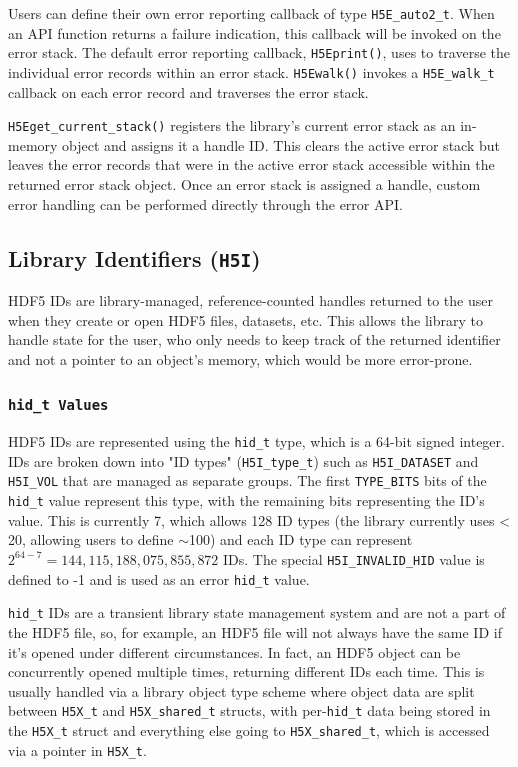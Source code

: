 \begin{itemize}
Users can define their own error reporting callback of type \texttt{H5E\_auto2\_t}. When an API function returns a failure indication, this callback will be invoked on the error stack. The default error reporting callback, \texttt{H5Eprint()}, uses  to traverse the individual error records within an error stack. \texttt{H5Ewalk()} invokes a \texttt{H5E\_walk\_t} callback on each error record and traverses the error stack.

\texttt{H5Eget\_current\_stack()} registers the library's current error stack as an in-memory object and assigns it a handle ID. This clears the active error stack but leaves the error records that were in the active error stack accessible within the returned error stack object. Once an error stack is assigned a handle, custom error handling can be performed directly through the error API. 
\end{itemize}

\subsection{Library Identifiers (\texttt{H5I})}\label{ref:handles}

HDF5 IDs are library-managed, reference-counted handles returned to the user when they create or open HDF5 files, datasets, etc. This allows the library to handle state for the user, who only needs to keep track of the returned identifier and not a pointer to an object's memory, which would be more error-prone.

\subsubsection{\texttt{hid\_t Values}}

HDF5 IDs are represented using the \texttt{hid\_t} type, which is a 64-bit signed integer. IDs are broken down into "ID types" (\texttt{H5I\_type\_t}) such as \texttt{H5I\_DATASET} and \texttt{H5I\_VOL} that are managed as separate groups. The first \texttt{TYPE\_BITS} bits of the \texttt{hid\_t} value represent this type, with the remaining bits representing the ID's value. This is currently 7, which allows 128 ID types (the library currently uses < 20, allowing users to define $\sim$100) and each ID type can represent $2^{64-7} = 144,115,188,075,855,872$ IDs. The special \texttt{H5I\_INVALID\_HID} value is defined to -1 and is used as an error \texttt{hid\_t} value.

\texttt{hid\_t} IDs are a transient library state management system and are not a part of the HDF5 file, so, for example, an HDF5 file will not always have the same ID if it's opened under different circumstances. In fact, an HDF5 object can be concurrently opened multiple times, returning different IDs each time. This is usually handled via a library object type scheme where object data are split between \texttt{H5X\_t} and \texttt{H5X\_shared\_t} structs, with per-\texttt{hid\_t} data being stored in the \texttt{H5X\_t} struct and everything else going to \texttt{H5X\_shared\_t}, which is accessed via a pointer in \texttt{H5X\_t}.

